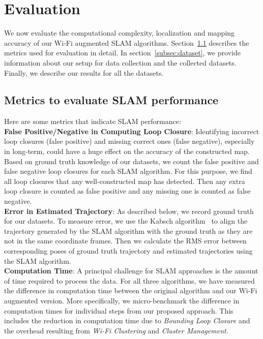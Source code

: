 \section{Evaluation}\label{sec:eval}
We now evaluate the computational complexity, localization and mapping accuracy of our Wi-Fi augmented SLAM algorithms. 
Section~\ref{subsec:slam-performance} describes the metrics used for evaluation in detail. 
In section~\ref{subsec:dataset}, we provide information about our setup for data collection and the collected datasets. 
Finally, we describe our results for all the datasets.
\subsection{Metrics to evaluate SLAM performance}
\label{subsec:slam-performance}
Here are some metrics that indicate SLAM performance: \\
\textbf{False Positive/Negative in Computing Loop Closure}: Identifying incorrect loop closures (false positive) and missing correct ones (false negative), especially in long-term, could have a huge effect on the accuracy of the constructed map. 
Based on ground truth knowledge of our datasets, we count the false positive and false negative loop closures for each SLAM algorithm. 
For this purpose, we find all loop closures that any well-constructed map has detected. Then any extra loop closure is counted as false positive and any missing one is counted as false negative.  \\
\textbf{Error in Estimated Trajectory}: 
As described below, we record ground truth for our datasets. To measure error, we use the Kabsch algorithm~\cite{kabsch} to align the trajectory generated
by the SLAM algorithm with the ground truth as they are not in the same coordinate frames. 
Then we calculate the RMS error between corresponding poses of ground truth trajectory and estimated trajectories
using the SLAM algorithm. \\
\textbf{Computation Time}: A principal challenge for SLAM approaches is the amount of time required to process the data.
 For all three algorithms, we have measured the difference in computation time between the original algorithm and our Wi-Fi augmented version. 
 More specifically, we micro-benchmark the difference in computation times for individual steps from our proposed approach. 
 This includes the reduction in computation time due to {\it Bounding Loop Closure} and the overhead resulting from {\it Wi-Fi Clustering} and {\it Cluster Management}.  
